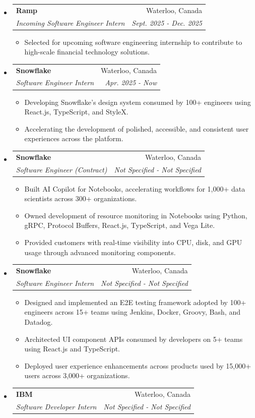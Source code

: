 \documentclass[letterpaper,11pt]{article}
\makeatletter
\newcommand{\resitem}[1]{\item #1 \vspace{-2pt}}
\newcommand{\ressubheading}[4]{
    \begin{tabular*}{6.5in}{p{4.8in}@{\extracolsep{\fill}}r}
            \textbf{#1} & #2 \\
            \textit{#3} & \textit{#4} \\
    \end{tabular*}\vspace{-8pt}}
\makeatother
\begin{document}
      \begin{itemize}
        \item \ressubheading{Ramp}{Waterloo, Canada}{Incoming Software Engineer Intern}{Sept. 2025 - Dec. 2025}
        \begin{itemize}
            \resitem{Selected for upcoming software engineering internship to contribute to high-scale financial technology solutions.}
        \end{itemize}
        \item \ressubheading{Snowflake}{Waterloo, Canada}{Software Engineer Intern}{Apr. 2025 - Now}
        \begin{itemize}
            \resitem{Developing Snowflake's design system consumed by 100+ engineers using React.js, TypeScript, and StyleX.}
            \resitem{Accelerating the development of polished, accessible, and consistent user experiences across the platform.}
        \end{itemize}
        \item \ressubheading{Snowflake}{Waterloo, Canada}{Software Engineer (Contract)}{Not Specified - Not Specified}
        \begin{itemize}
            \resitem{Built AI Copilot for Notebooks, accelerating workflows for 1,000+ data scientists across 300+ organizations.}
            \resitem{Owned development of resource monitoring in Notebooks using Python, gRPC, Protocol Buffers, React.js, TypeScript, and Vega Lite.}
            \resitem{Provided customers with real-time visibility into CPU, disk, and GPU usage through advanced monitoring components.}
        \end{itemize}
        \item \ressubheading{Snowflake}{Waterloo, Canada}{Software Engineer Intern}{Not Specified - Not Specified}
        \begin{itemize}
            \resitem{Designed and implemented an E2E testing framework adopted by 100+ engineers across 15+ teams using Jenkins, Docker, Groovy, Bash, and Datadog.}
            \resitem{Architected UI component APIs consumed by developers on 5+ teams using React.js and TypeScript.}
            \resitem{Deployed user experience enhancements across products used by 15,000+ users across 3,000+ organizations.}
        \end{itemize}
        \item \ressubheading{IBM}{Waterloo, Canada}{Software Developer Intern}{Not Specified - Not Specified}
        \begin{itemize}

\end{itemize}
\end{itemize}
\end{document}
